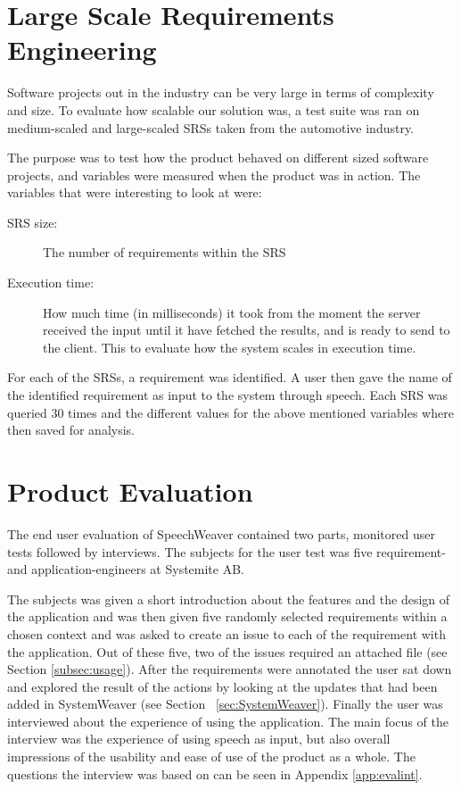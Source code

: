 \section{Large Scale Requirements Engineering}
\label{sec:largere}
Software projects out in the industry can be very large in terms of complexity and size. To evaluate how scalable our solution was, a test suite was ran on medium-scaled and large-scaled SRSs \citep{regnell2008} taken from the automotive industry.

The purpose was to test how the product behaved on different sized software projects, and variables were measured when the product was in action. The variables that were interesting to look at were:


\begin{description}
\item [SRS size:] The number of requirements within the SRS
\item [Execution time:] How much time (in milliseconds) it took from the moment the server received the input until it have fetched the results, and is ready to send to the client. This to evaluate how the system scales in execution time.

\end{description}
For each of the SRSs, a requirement was identified. A user then gave the name of the identified requirement as input to the system through speech. Each SRS was queried 30 times and the different values for the above mentioned variables where then saved for analysis.

\section{Product Evaluation}
\label{sec:usertestusa}
The end user evaluation of SpeechWeaver contained two parts, monitored user tests followed by interviews. 
The subjects for the user test was five requirement- and application-engineers at Systemite AB.

The subjects was given a short introduction about the features and the design of the application and was then given five randomly selected requirements within a chosen context and was asked to create an issue to each of the requirement with the application. Out of these five, two of the issues required an attached file (see Section \ref{subsec:usage}). After the requirements were annotated the user sat down and explored the result of the actions by looking at the updates that had been added in SystemWeaver (see Section ~\ref{sec:SystemWeaver}). Finally the user was interviewed about the experience of using the application. The main focus of the interview was the experience of using speech as input, but also overall impressions of the usability and ease of use of the product as a whole. The questions the interview was based on can be seen in Appendix \ref{app:evalint}.













